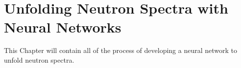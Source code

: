 \chapter{Unfolding Neutron Spectra with Neural Networks}\label{chap_chap4}
This Chapter will contain all of the process of developing a neural network to unfold neutron spectra.